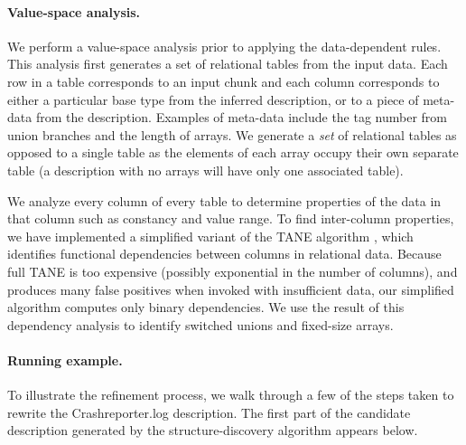 \paragraph*{Value-space analysis.}
We perform a value-space analysis prior
to applying the data-dependent rules.
This analysis first generates a set of relational tables from the input data.
Each row in a table corresponds to an input chunk and each column
corresponds to either a particular base type from the inferred description,
or to a piece of meta-data from the description.  Examples of meta-data
include the tag number from union branches and the length of arrays.
We generate a {\em set} of relational tables as opposed to a single table
as the elements of each array occupy their own separate table (a description 
with no arrays will have only one associated table).

We analyze every column of every table to determine properties of the
data in that column such as constancy and value range. 
To find inter-column properties, we have implemented a simplified
variant of the TANE algorithm \cite{TANE-HKPT99},
which identifies functional dependencies between columns in 
relational data.  Because full TANE is too expensive
(possibly exponential in the number of columns), 
and produces many false positives when invoked with insufficient data,
our simplified algorithm computes only binary dependencies. We use the 
result of this dependency analysis to identify switched unions and
fixed-size arrays. 

\paragraph*{Running example.}
To illustrate the refinement process, we walk through a few of the
steps taken to rewrite the 
Crashreporter.log description.  The first part of the
candidate description generated by the structure-discovery algorithm
appears below.

